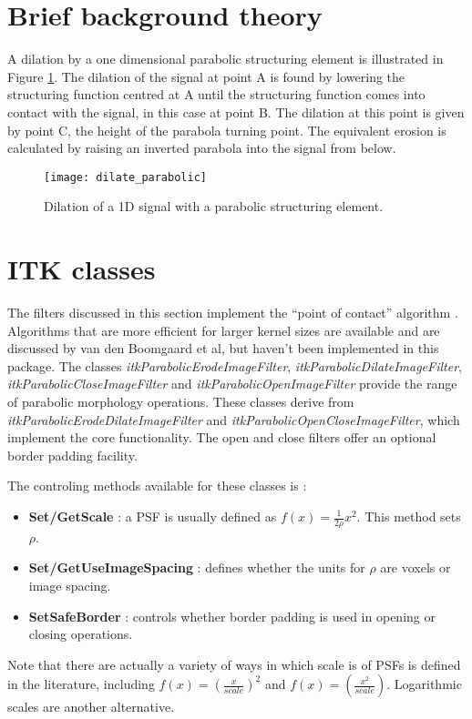 \documentclass{InsightArticle}
\begin{document}
\section{Brief background theory}
A dilation by a one dimensional parabolic structuring element is
illustrated in Figure \ref{fig:paradilate}. The dilation of the signal
at point A is found by lowering the structuring function centred at A
until the structuring function comes into contact with the signal, in
this case at point B. The dilation at this point is given by point C,
the height of the parabola turning point. The equivalent erosion is
calculated by raising an inverted parabola into the signal from below.

\begin{figure}[htbp]
\centering
\texttt{[image: dilate\_parabolic]}
\caption{Dilation of a 1D signal with a parabolic structuring element.\label{fig:paradilate}}
\end{figure}

\section{ITK classes}
The filters discussed in this section implement the ``point of
contact'' algorithm \cite{Boomgaard96}. Algorithms that are more
efficient for larger kernel sizes are available and are discussed by
van den Boomgaard et al, but haven't been implemented in this package.
The classes {\em itkParabolicErodeImageFilter}, {\em
itkParabolicDilateImageFilter}, {\em itkParabolicCloseImageFilter} and
{\em itkParabolicOpenImageFilter} provide the range of parabolic
morphology operations. These classes derive from {\em
itkParabolicErodeDilateImageFilter} and {\em
itkParabolicOpenCloseImageFilter}, which implement the core
functionality. The open and close filters offer an optional border
padding facility.

The controling methods available for these classes is :
\begin{itemize}
\item {\bf Set/GetScale} : a PSF is usually defined as $f(x)=\frac{1}{2\rho}x^2$. This method sets $\rho$.
\item {\bf Set/GetUseImageSpacing} : defines whether the units for $\rho$ are voxels or image spacing.
\item {\bf SetSafeBorder} : controls whether border padding is used in opening or closing operations.
\end{itemize}

Note that there are actually a variety of ways in which scale is of
PSFs is defined in the literature, including $f(x) =
(\frac{x}{scale})^2$ and $f(x) = (\frac{x^2}{scale})$. Logarithmic
scales are another alternative.
\end{document}

